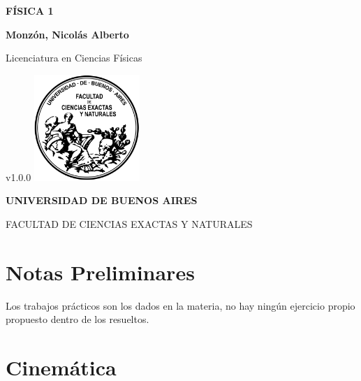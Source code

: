 \documentclass[a4paper, 12pt, oneside, titlepage, openany]{book}
\begin{document}

\begin{titlepage}

	\centering
	{\textbf{\fontsize{16}{17}\selectfont F\'ISICA 1} \par}
	\vspace{1cm}
	{\textbf{\fontsize{16}{17}\selectfont Monz\'on, Nicol\'as Alberto} \par}
	\vspace{1.5cm}
	{\fontsize{16}{17}\selectfont Licenciatura en Ciencias F\'isicas \par}
	\vspace{1cm}
	\vfill
		v1.0.0
	\vfill
	\includegraphics[width=0.30\textwidth]{../images/UBA}\par \vspace{1cm}
	{\textbf{\fontsize{14}{14}\selectfont UNIVERSIDAD DE BUENOS AIRES} \par}
	{\fontsize{14}{14}\selectfont FACULTAD DE CIENCIAS EXACTAS Y NATURALES \par}

\end{titlepage}

\chapter*{Notas Preliminares}
Los trabajos pr\'acticos son los dados en la materia, no hay ning\'un ejercicio propio propuesto dentro de los resueltos.

\tableofcontents

\chapter{Cinem\'atica}


%



\end{document}

